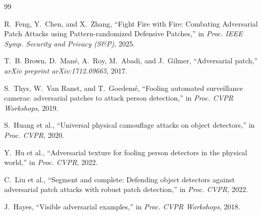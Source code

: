 \documentclass[conference]{IEEEtran}
\begin{document}

\begin{thebibliography}{99}

R.~Feng, Y.~Chen, and X.~Zhang,
``Fight Fire with Fire: Combating Adversarial Patch Attacks using
Pattern-randomized Defensive Patches,''
in \textit{Proc. IEEE Symp. Security and Privacy (S\&P)}, 2025.

T.~B. Brown, D.~Man\'e, A.~Roy, M.~Abadi, and J.~Gilmer,
``Adversarial patch,''
\textit{arXiv preprint arXiv:1712.09665}, 2017.

S.~Thys, W.~Van Ranst, and T.~Goedem\'e,
``Fooling automated surveillance cameras: adversarial patches to attack
person detection,''
in \textit{Proc. CVPR Workshops}, 2019.

S.~Huang et al.,
``Universal physical camouflage attacks on object detectors,''
in \textit{Proc. CVPR}, 2020.

Y.~Hu et al.,
``Adversarial texture for fooling person detectors in the physical world,''
in \textit{Proc. CVPR}, 2022.

C.~Liu et al.,
``Segment and complete: Defending object detectors against adversarial
patch attacks with robust patch detection,''
in \textit{Proc. CVPR}, 2022.

J.~Hayes,
``Visible adversarial examples,''
in \textit{Proc. CVPR Workshops}, 2018.

\end{thebibliography}
\end{document}
